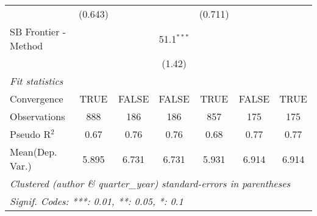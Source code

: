 \begin{tabular}{lcccccc}
                                & (0.643)       &               &                & (0.711)       &               &   \\   
   SB Frontier - Method         &               &               & 51.1$^{***}$   &               &               &   \\   
                                &               &               & (1.42)         &               &               &   \\   
   \midrule
   \emph{Fit statistics}\\
   Convergence                  &TRUE           & FALSE         & FALSE          & TRUE          & FALSE         & TRUE\\  
   Observations                 & 888           & 186           & 186            & 857           & 175           & 175\\  
   Pseudo R$^2$                 & 0.67          & 0.76          & 0.76           & 0.68          & 0.77          & 0.77\\  
Mean(Dep. Var.) & 5.895 & 6.731 & 6.731 & 5.931 & 6.914 & 6.914 \\
   \midrule \midrule
   \multicolumn{7}{l}{\emph{Clustered (author \& quarter\_year) standard-errors in parentheses}}\\
   \multicolumn{7}{l}{\emph{Signif. Codes: ***: 0.01, **: 0.05, *: 0.1}}\\
\end{tabular}
\par\endgroup
